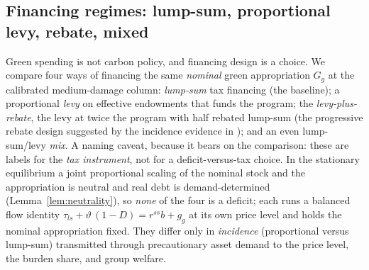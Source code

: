 \documentclass[12pt]{article}
\makeatletter
\newcommand{\FloatBarrier}{\par
    \begingroup\let\@elt\relax
    \edef\reserved@a{\@deferlist}\endgroup
    \ifx\reserved@a\@empty\else\clearpage\fi}
\makeatother
\begin{document}

\FloatBarrier
\subsection{Financing regimes: lump-sum, proportional levy, rebate, mixed}
\label{subsec:regimes}

Green spending is not carbon policy, and financing design is a choice. We
compare four ways of financing the same \emph{nominal} green
appropriation $G_g$ at the calibrated medium-damage column: \emph{lump-sum}
tax financing (the baseline); a proportional \emph{levy} on
effective endowments that funds the program; the \emph{levy-plus-rebate},
the levy at twice the program with half rebated lump-sum (the progressive
rebate design suggested by the incidence evidence in
\citealp{kanzig2023carbon}); and an even lump-sum/levy \emph{mix}. A naming
caveat, because it bears on the
comparison: these are labels for the \emph{tax instrument}, not for a
deficit-versus-tax choice. In the stationary equilibrium a joint proportional scaling of the nominal
stock and the appropriation is neutral and real debt is demand-determined
(Lemma~\ref{lem:neutrality}), so \emph{none} of the four is a deficit; each
runs a balanced flow identity $\tau_{ls} + \vartheta\,(1-D) = r^{ss} b + g_g$
at its own price level and holds the nominal appropriation fixed. They differ
only in \emph{incidence} (proportional versus lump-sum) transmitted
through precautionary asset demand to the price level, the burden share, and
group welfare.
\end{document}
